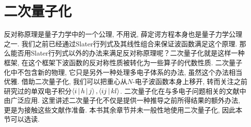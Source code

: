 \section{二次量子化}
\label{sec2.4}
反对称原理是量子力学中的一个公理, 不用说, 薛定谔方程本身也是量子力学公理之一. 我们之前已经通过Slater行列式及其线性组合来保证波函数满足这个原理. 那么能否用Slater行列式以外的办法来满足反对称原理呢？二次量子化就是这样一种框架, 在这个框架下波函数的反对称性质被转化为一些算子的代数性质. 二次量子化中不包含新的物理, 它只是另外一种处理多电子体系的办法, 虽然这个办法相当优雅. 借助二次量子化, 我们可以把重心从$N$-电子波函数本身上移开, 转而关注之前研究过的单双电子积分$\Braket{i|h|j}, \Braket{ij|kl}$. 二次量子化在与多电子问题相关的文献中由广泛应用. 这里讲述二次量子化不仅是提供一种推导之前所得结果的额外办法, 更是为接触这些文献作准备. 本书其余章节并未一般性地使用二次量子化, 因此本节可以选读.
